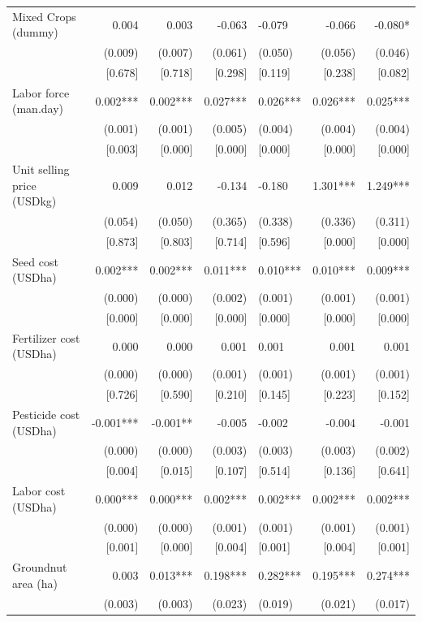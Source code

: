 \documentclass[
]{article}
\begin{document}
\begin{ThreePartTable}
\begin{longtable}[t]{lrrrlrr}
Mixed Crops (dummy) & 0.004 & 0.003 & -0.063 & -0.079 & -0.066 & -0.080*\\
 & (0.009) & (0.007) & (0.061) & (0.050) & (0.056) & (0.046)\\
 & {}[0.678] & {}[0.718] & {}[0.298] & {}[0.119] & {}[0.238] & {}[0.082]\\
Labor force (man.day) & 0.002*** & 0.002*** & 0.027*** & 0.026*** & 0.026*** & 0.025***\\
 & (0.001) & (0.001) & (0.005) & (0.004) & (0.004) & (0.004)\\
 & {}[0.003] & {}[0.000] & {}[0.000] & {}[0.000] & {}[0.000] & {}[0.000]\\
Unit selling price (USD\/kg) & 0.009 & 0.012 & -0.134 & -0.180 & 1.301*** & 1.249***\\
 & (0.054) & (0.050) & (0.365) & (0.338) & (0.336) & (0.311)\\
 & {}[0.873] & {}[0.803] & {}[0.714] & {}[0.596] & {}[0.000] & {}[0.000]\\
Seed cost (USD\/ha) & 0.002*** & 0.002*** & 0.011*** & 0.010*** & 0.010*** & 0.009***\\
 & (0.000) & (0.000) & (0.002) & (0.001) & (0.001) & (0.001)\\
 & {}[0.000] & {}[0.000] & {}[0.000] & {}[0.000] & {}[0.000] & {}[0.000]\\
Fertilizer cost (USD\/ha) & 0.000 & 0.000 & 0.001 & 0.001 & 0.001 & 0.001\\
 & (0.000) & (0.000) & (0.001) & (0.001) & (0.001) & (0.001)\\
 & {}[0.726] & {}[0.590] & {}[0.210] & {}[0.145] & {}[0.223] & {}[0.152]\\
Pesticide cost (USD\/ha) & -0.001*** & -0.001** & -0.005 & -0.002 & -0.004 & -0.001\\
 & (0.000) & (0.000) & (0.003) & (0.003) & (0.003) & (0.002)\\
 & {}[0.004] & {}[0.015] & {}[0.107] & {}[0.514] & {}[0.136] & {}[0.641]\\
Labor cost (USD\/ha) & 0.000*** & 0.000*** & 0.002*** & 0.002*** & 0.002*** & 0.002***\\
 & (0.000) & (0.000) & (0.001) & (0.001) & (0.001) & (0.001)\\
 & {}[0.001] & {}[0.000] & {}[0.004] & {}[0.001] & {}[0.004] & {}[0.001]\\
Groundnut area (ha) & 0.003 & 0.013*** & 0.198*** & 0.282*** & 0.195*** & 0.274***\\
 & (0.003) & (0.003) & (0.023) & (0.019) & (0.021) & (0.017)\\

\end{longtable}
\end{ThreePartTable}
\end{document}
